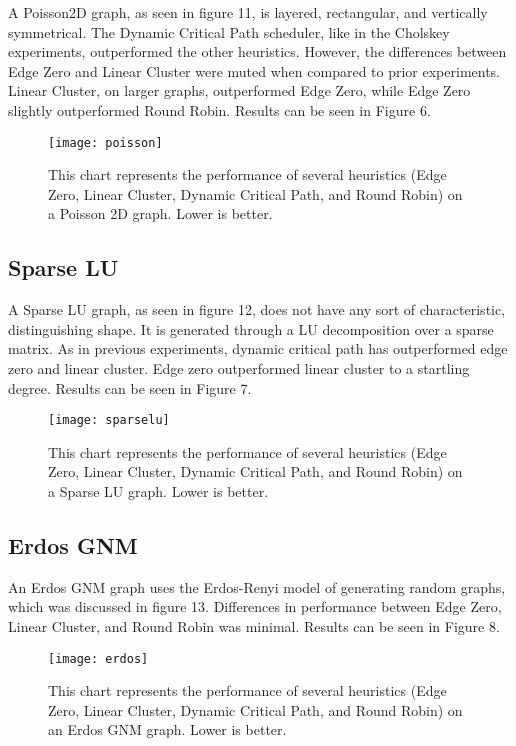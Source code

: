 \documentclass[11pt, oneside]{article}   	%
\begin{document}
A Poisson2D graph, as seen in figure 11, is layered, rectangular, and vertically symmetrical. The Dynamic Critical Path scheduler, like in the Cholskey experiments, outperformed the other heuristics. However, the differences between Edge Zero and Linear Cluster were muted when compared to prior experiments. Linear Cluster, on larger graphs, outperformed Edge Zero, while Edge Zero slightly outperformed Round Robin. Results can be seen in Figure 6.

\begin{figure}[t]
\texttt{[image: poisson]}
\centering
\caption{This chart represents the performance of several heuristics (Edge Zero, Linear Cluster, Dynamic Critical Path, and Round Robin) on a Poisson 2D graph. Lower is better.}
\end{figure}

\subsection{Sparse LU}
	
A Sparse LU graph, as seen in figure 12, does not have any sort of characteristic, distinguishing shape. It is generated through a LU decomposition over a sparse matrix\cite{ludecomp}. As in previous experiments, dynamic critical path has outperformed edge zero and linear cluster. Edge zero outperformed linear cluster to a startling degree. Results can be seen in Figure 7.

\begin{figure}[t]
\texttt{[image: sparselu]}
\centering
\caption{This chart represents the performance of several heuristics (Edge Zero, Linear Cluster, Dynamic Critical Path, and Round Robin) on a Sparse LU graph. Lower is better.}
\end{figure}

\subsection{Erdos GNM}
	
An Erdos GNM graph uses the Erdos-Renyi model of generating random graphs, which was discussed in figure 13. Differences in performance between Edge Zero, Linear Cluster, and Round Robin was minimal. Results can be seen in Figure 8.

\begin{figure}[t]
\texttt{[image: erdos]}
\centering
\caption{This chart represents the performance of several heuristics (Edge Zero, Linear Cluster, Dynamic Critical Path, and Round Robin) on an Erdos GNM graph. Lower is better.}
\end{figure}
\end{document}
